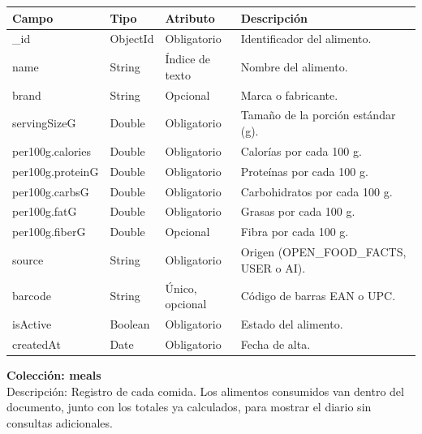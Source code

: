 {\footnotesize
\renewcommand{\arraystretch}{1.2}
\begin{longtable}{|>{\raggedright\arraybackslash}p{4.7cm}|>{\raggedright\arraybackslash}p{1.8cm}|>{\raggedright\arraybackslash}p{2.3cm}|>{\raggedright\arraybackslash}p{5.4cm}|}
    \hline
    \rowcolor[HTML]{EFEFEF}
    \textbf{Campo} & \textbf{Tipo} & \textbf{Atributo} & \textbf{Descripción} \\ \hline
    \endhead
    \_id & ObjectId & Obligatorio & Identificador del alimento. \\ \hline
    name & String & Índice de texto & Nombre del alimento. \\ \hline
    brand & String & Opcional & Marca o fabricante. \\ \hline
    servingSizeG & Double & Obligatorio & Tamaño de la porción estándar (g). \\ \hline
    per100g.\allowbreak calories & Double & Obligatorio & Calorías por cada 100 g. \\ \hline
    per100g.\allowbreak proteinG & Double & Obligatorio & Proteínas por cada 100 g. \\ \hline
    per100g.\allowbreak carbsG & Double & Obligatorio & Carbohidratos por cada 100 g. \\ \hline
    per100g.\allowbreak fatG & Double & Obligatorio & Grasas por cada 100 g. \\ \hline
    per100g.\allowbreak fiberG & Double & Opcional & Fibra por cada 100 g. \\ \hline
    source & String & Obligatorio & Origen (OPEN\_FOOD\_FACTS, USER o AI). \\ \hline
    barcode & String & Único, opcional & Código de barras EAN o UPC. \\ \hline
    isActive & Boolean & Obligatorio & Estado del alimento. \\ \hline
    createdAt & Date & Obligatorio & Fecha de alta. \\ \hline
\end{longtable}
}
\noindent\textbf{Colección: meals} \\
Descripción: Registro de cada comida. Los alimentos consumidos van dentro del documento, junto con los totales ya calculados, para mostrar el diario sin consultas adicionales.
